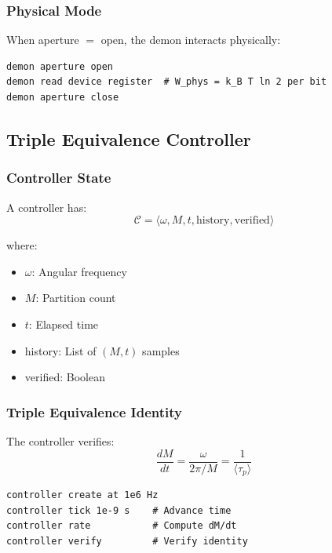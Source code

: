 \documentclass[twocolumn,10pt]{article}
\theoremstyle{definition}
\theoremstyle{remark}
\begin{document}
\subsubsection{Physical Mode}

When aperture $= $ open, the demon interacts physically:
\begin{lstlisting}
demon aperture open
demon read device register  # W_phys = k_B T ln 2 per bit
demon aperture close
\end{lstlisting}

\subsection{Triple Equivalence Controller}

\subsubsection{Controller State}

A controller has:
\begin{equation}
    \mathcal{C} = \langle\omega, M, t, \text{history}, \text{verified}\rangle
\end{equation}

where:
\begin{itemize}
    \item $\omega$: Angular frequency
    \item $M$: Partition count
    \item $t$: Elapsed time
    \item history: List of $(M, t)$ samples
    \item verified: Boolean
\end{itemize}

\subsubsection{Triple Equivalence Identity}

The controller verifies:
\begin{equation}
    \frac{dM}{dt} = \frac{\omega}{2\pi/M} = \frac{1}{\langle\tau_p\rangle}
\end{equation}

\begin{lstlisting}
controller create at 1e6 Hz
controller tick 1e-9 s    # Advance time
controller rate           # Compute dM/dt
controller verify         # Verify identity
\end{lstlisting}
\end{document}
